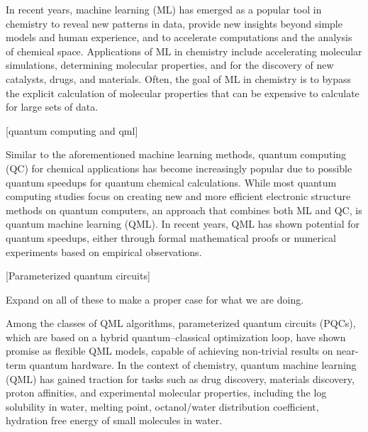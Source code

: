 \documentclass[journal=jacsat,manuscript=article]{achemso}
\begin{document}
In recent years, machine learning (ML) has emerged as a popular tool in chemistry to reveal new patterns in data, provide new insights beyond simple models and human experience, and to accelerate computations and the analysis of chemical space.
Applications of ML in chemistry include accelerating molecular simulations\cite{behler_perspective_2016,ssmith_ani-1_2017,gao_torchani_2020}, determining molecular properties\cite{yang_analyzing_2019,ramakrishnan_quantum_2014,ramakrishnan_big_2015,hansen_machine_2015,unke_physnet_2019}, and for the discovery of new catalysts\cite{zhong_accelerated_2020,nandy_computational_2021,mjones_data-driven_2023}, drugs\cite{goh_deep_2017,yang_concepts_2019}, and materials.\cite{butler_machine_2018,sanchez-lengeling_inverse_2018,raccuglia_machine-learning-assisted_2016}
Often, the goal of ML in chemistry is to bypass the explicit calculation of molecular properties that can be expensive to calculate for large sets of data.\cite{janet_machine_2020}


[quantum computing and qml]

Similar to the aforementioned machine learning methods, quantum computing (QC) for chemical applications has become increasingly popular due to possible quantum speedups for quantum chemical calculations.\cite{cao_quantum_2019}
While most quantum computing studies focus on creating new and more efficient electronic structure methods on quantum computers\cite{romero_strategies_2019,mcardle_quantum_2020,bauer_quantum_2020,cao_quantum_2019}, an approach that combines both ML and QC, is quantum machine learning (QML).
In recent years, QML has shown potential for quantum speedups, either through formal mathematical proofs or numerical experiments based on empirical observations.\cite{biamonte_quantum_2017}

[Parameterized quantum circuits]

Expand on all of these to make a proper case for what we are doing.

Among the classes of QML algorithms, parameterized quantum circuits (PQCs), which are based on a hybrid quantum--classical optimization loop, have shown promise as flexible QML models, capable of achieving non-trivial results on near-term quantum hardware.\cite{benedetti_parameterized_2019,suzuki_predicting_2020}
In the context of chemistry, quantum machine learning (QML) has gained traction for tasks such as drug discovery\cite{suzuki_predicting_2020,smaldone_quantum--classical_2024,bhatia_quantum_2023,kao_exploring_2023,li_quantum_2021,avramouli_quantum_2023,avramouli_unlocking_2023}, materials discovery\cite{ishiyama_noise-robust_2022,ryu_quantum_2023,vitz_hybrid_2024}, proton affinities\cite{jin_integrating_2025}, and experimental molecular properties, including the log solubility in water, melting point, octanol/water distribution coefficient, hydration free energy of small molecules in water.\cite{hatakeyama-sato_quantum_2023}
\end{document}
